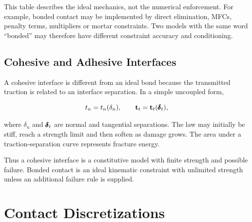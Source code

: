 \begin{center}
\end{center}

This table describes the ideal mechanics, not the numerical enforcement. For
example, bonded contact may be implemented by direct elimination, MFCs, penalty
terms, multipliers or mortar constraints. Two models with the same word
``bonded'' may therefore have different constraint accuracy and conditioning.

\subsection{Cohesive and Adhesive Interfaces}

A cohesive interface is different from an ideal bond because the transmitted
traction is related to an interface separation. In a simple uncoupled form,

\begin{equation}
    t_n = t_n(\delta_n), \qquad
    \mathbf{t}_t = \mathbf{t}_t(\pmb{\delta}_t),
\end{equation}

where $ \delta_n $ and $ \pmb{\delta}_t $ are normal and tangential separations.
The law may initially be stiff, reach a strength limit and then soften as damage
grows. The area under a traction-separation curve represents fracture energy.

Thus a cohesive interface is a constitutive model with finite strength and
possible failure. Bonded contact is an ideal kinematic constraint with unlimited
strength unless an additional failure rule is supplied.

\section{Contact Discretizations}


